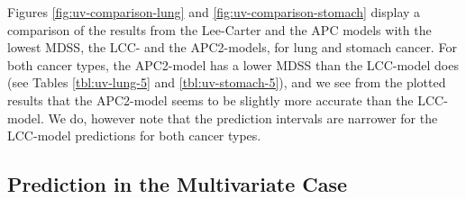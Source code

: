 Figures \ref{fig:uv-comparison-lung} and \ref{fig:uv-comparison-stomach} display a comparison of the results from the Lee-Carter and the APC models with the lowest MDSS, the LCC- and the APC2-models, for lung and stomach cancer. For both cancer types, the APC2-model has a lower MDSS than the LCC-model does (see Tables \ref{tbl:uv-lung-5} and \ref{tbl:uv-stomach-5}), and we see from the plotted results that the APC2-model seems to be slightly more accurate than the LCC-model. We do, however note that the prediction intervals are narrower for the LCC-model predictions for both cancer types.

\newpage
\subsection{Prediction in the Multivariate Case}
\label{sec:pred-mv}


